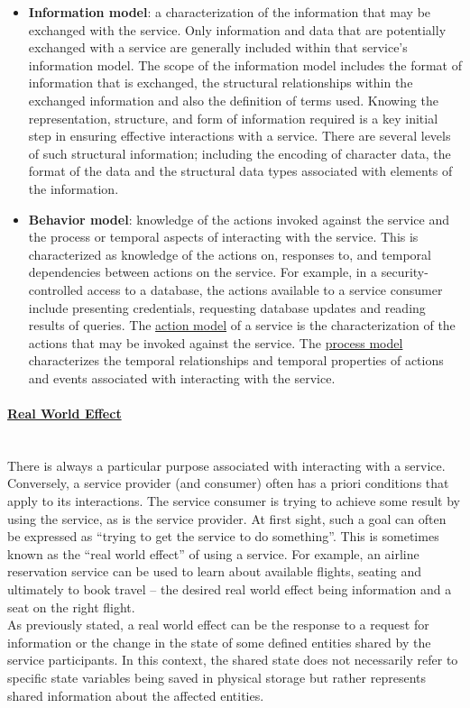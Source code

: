 \documentclass[10pt,a4paper]{article}
\newcommand{\myparagraph}[1]{\paragraph{\uline{#1}}\mbox{}\\[0.05in]}
\begin{document}
\begin{itemize}
	\item \textbf{Information model}: a characterization of the information that may be exchanged with the service. Only information and data that are potentially exchanged with a service are generally included within that service's information model. The scope of the information model includes the format of information that is exchanged, the structural relationships within the exchanged information and also the definition of terms used. Knowing the representation, structure, and form of information required is a key initial step in ensuring effective interactions with a service. There are several levels of such structural information; including the encoding of character data, the format of the data and the structural data types associated with elements of the information.
	\item \textbf{Behavior model}: knowledge of the actions invoked against the service and the process or temporal aspects of interacting with the service. This is characterized as knowledge of the actions on, responses to, and temporal dependencies between actions on the service. For example, in a security-controlled access to a database, the actions available to a service consumer include presenting credentials, requesting database updates and reading results of queries. The \uline{action model} of a service is the characterization of the actions that may be invoked against the service. The \uline{process model} characterizes the temporal relationships and temporal properties of actions and events associated with interacting with the service.
\end{itemize}
\myparagraph{Real World Effect}
There is always a particular purpose associated with interacting with a service. Conversely, a service provider (and consumer) often has a priori conditions that apply to its interactions. The service consumer is trying to achieve some result by using the service, as is the service provider. At first sight, such a goal can often be expressed as “trying to get the service to do something”. This is sometimes known as the “real world effect” of using a service. For example, an airline reservation service can be used to learn about available flights, seating and ultimately to book travel – the desired real world effect being information and a seat on the right flight.
\\ As previously stated, a real world effect can be the response to a request for information or the change in the state of some defined entities shared by the service participants. In this context, the shared state does not necessarily refer to specific state variables being saved in physical storage but rather represents shared information about the affected entities.
\end{document}
